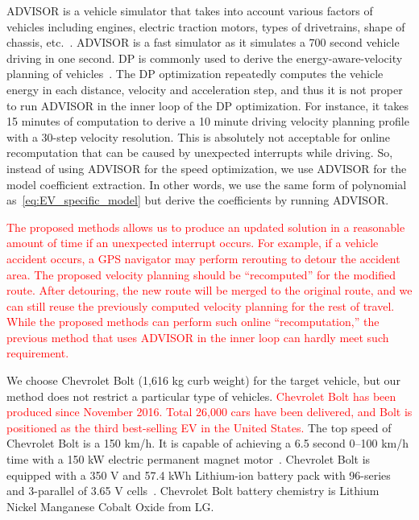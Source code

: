 \documentclass{IEEEtran}
\begin{document}
ADVISOR is a vehicle simulator that takes into account various factors of vehicles including engines, electric traction motors, types of drivetrains, shape of chassis, etc.~\cite{Markel:JPS02}. ADVISOR is a fast simulator as it simulates a 700 second vehicle driving in one second. DP is commonly used to derive the energy-aware-velocity planning of vehicles~\cite{Lin:ICCA14,Dib:IVPPC11}. The DP optimization repeatedly computes the vehicle energy in each distance, velocity and acceleration step, and thus it is not proper to run ADVISOR in the inner loop of the DP optimization. For instance, it takes 15 minutes of computation to derive a 10 minute driving velocity planning profile with a 30-step velocity resolution. This is absolutely not acceptable for online recomputation that can be caused by unexpected interrupts while driving. So, instead of using ADVISOR for the speed optimization, we use ADVISOR for the model coefficient extraction. In other words, we use the same form of polynomial as~\eqref{eq:EV_specific_model} but derive the coefficients by running ADVISOR. 

\textcolor{red}{The proposed methods allows us to produce an updated solution in a reasonable amount of time if an unexpected interrupt occurs. For example, if a vehicle accident occurs, a GPS navigator may perform rerouting to detour the accident area. The proposed velocity planning should be ``recomputed'' for the modified route. After detouring, the new route will be merged to the original route, and we can still reuse the previously computed  velocity planning for the rest of travel. While the proposed methods can perform such online ``recomputation,'' the previous method that uses ADVISOR in the inner loop can hardly meet such requirement.}

We choose Chevrolet Bolt (1,616 kg curb weight) for the target vehicle, but our method does not restrict a particular type of vehicles. \textcolor{red}{Chevrolet Bolt has been produced since November 2016. Total 26,000 cars have been  delivered, and Bolt is positioned as the third best-selling EV in the United States.} The top speed of Chevrolet Bolt is a 150 km/h. It is capable of achieving a 6.5 second 0--100 km/h time with a 150 kW electric permanent magnet motor~\cite{GM_Bolt:official}. Chevrolet Bolt is equipped with a 350 V and 57.4 kWh Lithium-ion battery pack with 96-series and 3-parallel of 3.65 V cells~\cite{GM_Bolt:spec}. Chevrolet Bolt battery chemistry is Lithium Nickel Manganese Cobalt Oxide from LG. 
\end{document}
